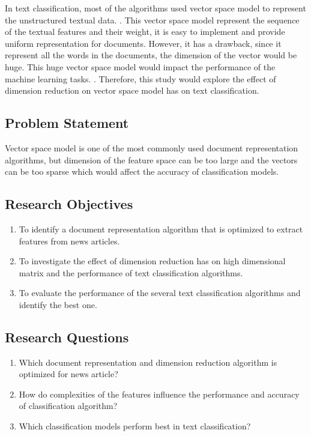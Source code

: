 In text classification, most of the algorithms used vector space model to represent the unstructured textual data. \cite{vectorSpaceModelText}. This vector space model represent the sequence of the textual features and their weight, it is easy to implement and provide uniform representation for documents. However, it has a drawback, since it represent all the words in the documents, the dimension of the vector would be huge. This huge vector space model would impact the performance of the machine learning tasks. \cite{knnVectorSpaceReduction}. Therefore, this study would explore the effect of dimension reduction on vector space model has on text classification.\\

\subsection{Problem Statement}
Vector space model is one of the most commonly used document representation algorithms, but dimension of the feature space can be too large and the vectors can be too sparse which would affect the accuracy of classification models.\\

\clearpage
\subsection{Research Objectives}
\begin{enumerate}
	\item To identify a document representation algorithm that is optimized to extract features from news articles.
	\item To investigate the effect of dimension reduction has on high dimensional matrix and the performance of text classification algorithms.
	\item To evaluate the performance of the several text classification algorithms and identify the best one.
\end{enumerate}


\subsection{Research Questions}
\begin{enumerate}
	\item Which document representation and dimension reduction algorithm is optimized for news article?
	\item How do complexities of the features influence the performance and accuracy of classification algorithm?
	\item Which classification models perform best in text classification?
\end{enumerate}


